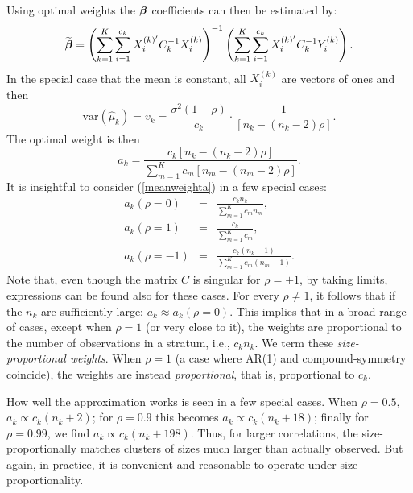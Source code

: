 \documentclass[11pt,a5paper,twoside]{book}
\newcommand{\bfbeta}{\mbox{\boldmath $\beta$}}
\begin{document}
Using optimal weights the $\bfbeta$ coefficients can then be estimated by:
\begin{equation}
\label{generalmean}
\widetilde{\bfbeta}= \left(  \sum_{k=1}^K \sum_{i=1}^{c_k} X_i^{(k)'}C_k^{-1}X_i^{(k)}\right)^{-1} \left(\sum_{k=1}^K\sum_{i=1}^{c_k} X_i^{(k)'}C_k^{-1}Y_i^{(k)}\right).
\end{equation}
In the special case that the mean is constant, all $X_i^{(k)}$ are vectors of ones and then
\begin{equation}
\label{varmuk}
\mbox{var}(\widehat{\mu}_k)=v_k=\frac{\sigma^2(1+\rho)}{c_k}\cdot
\frac{1}{\left[n_k-(n_k-2)\rho\right]}.
\end{equation}
The optimal weight is then
\begin{equation}
\label{meanweighta}
a_k=
\frac
{
c_k\left[n_k-(n_k-2)\rho\right]
}
{
\sum_{m=1}^Kc_m\left[n_m-(n_m-2)\rho\right]
}
.
\end{equation}
It is insightful to consider (\ref{meanweighta}) in a few special cases:
\begin{eqnarray}
a_k(\rho=0)&=&\frac{c_kn_k}{\sum_{m=1}^Kc_mn_m},\\
a_k(\rho=1)&=&\frac{c_k}{\sum_{m=1}^Kc_m},\\
a_k(\rho=-1)&=&\frac{c_k(n_k-1)}{\sum_{m=1}^Kc_m(n_m-1)}.
\end{eqnarray}
Note that, even though the matrix $C$ is singular for $\rho=\pm1$, by taking limits, expressions can be found also for these cases. 
For every
$\rho\ne 1$, it follows that if the $n_k$ are sufficiently large:
$a_k\approx a_k(\rho=0)$. This implies that in a broad range of cases, except when $\rho=1$ (or very close to it), the weights are proportional to the number of observations in a stratum, i.e., $c_kn_k$. We term these {\em size-proportional weights}. When $\rho=1$ (a case where AR(1) and compound-symmetry coincide), the weights are instead {\em proportional\/}, that is, proportional to $c_k$.

How well the approximation works is seen in a few special cases. When $\rho=0.5$,  $a_k\propto c_k(n_k+2)$; for $\rho=0.9$ this becomes $a_k\propto c_k(n_k+18)$; finally for $\rho=0.99$, we find $a_k\propto c_k(n_k+198)$. Thus, for larger correlations, the size-proportionally matches clusters of sizes much larger than actually observed. But again, in practice, it is convenient and reasonable to operate under size-proportionality.
\end{document}
